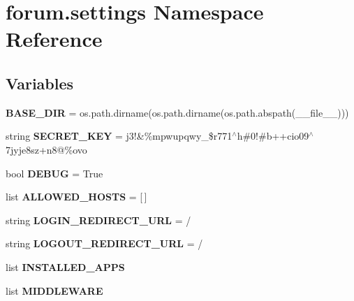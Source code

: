 \hypertarget{namespaceforum_1_1settings}{}\section{forum.\+settings Namespace Reference}
\label{namespaceforum_1_1settings}
\subsection*{Variables}
\begin{DoxyCompactItemize}
\item 
\mbox{\label{namespaceforum_1_1settings_a72852b7ebe1ad22576ef75ef2464b385}} 
{\bfseries B\+A\+S\+E\+\_\+\+D\+IR} = os.\+path.\+dirname(os.\+path.\+dirname(os.\+path.\+abspath(\+\_\+\+\_\+file\+\_\+\+\_\+)))
\item 
\mbox{\label{namespaceforum_1_1settings_a0711746d767e9b353582ffe5a5cce801}} 
string {\bfseries S\+E\+C\+R\+E\+T\+\_\+\+K\+EY} = \textquotesingle{}j3!\&\%mpwupqwy\+\_\+\$r771$^\wedge$h\#0!\#b++cio09$^\wedge$7jyje8sz+n8@\%ovo\textquotesingle{}
\item 
\mbox{\label{namespaceforum_1_1settings_ae91fc7a6eb3abc9ed75b8eb152c07f56}} 
bool {\bfseries D\+E\+B\+UG} = True
\item 
\mbox{\label{namespaceforum_1_1settings_a56f140e7eb09793215240062d44d64c3}} 
list {\bfseries A\+L\+L\+O\+W\+E\+D\+\_\+\+H\+O\+S\+TS} = \mbox{[}$\,$\mbox{]}
\item 
\mbox{\label{namespaceforum_1_1settings_ac662f66bde440d23abd315c435800511}} 
string {\bfseries L\+O\+G\+I\+N\+\_\+\+R\+E\+D\+I\+R\+E\+C\+T\+\_\+\+U\+RL} = \textquotesingle{}/\textquotesingle{}
\item 
\mbox{\label{namespaceforum_1_1settings_a9592dbdbb1770d427dc299998a6289c7}} 
string {\bfseries L\+O\+G\+O\+U\+T\+\_\+\+R\+E\+D\+I\+R\+E\+C\+T\+\_\+\+U\+RL} = \textquotesingle{}/\textquotesingle{}
\item 
list {\bfseries I\+N\+S\+T\+A\+L\+L\+E\+D\+\_\+\+A\+P\+PS}
\item 
list {\bfseries M\+I\+D\+D\+L\+E\+W\+A\+RE}

\end{DoxyCompactItemize}
